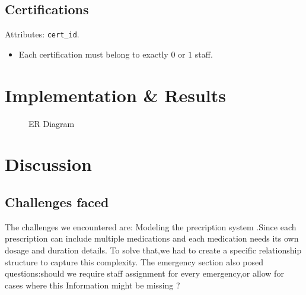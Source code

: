 \documentclass[a4paper,12pt]{article}
\begin{document}
\subsection*{Certifications}
Attributes: \texttt{cert\_id}.
\begin{itemize}
    \item Each certification must belong to exactly $0$ or $1$ staff.
\end{itemize}
\section{Implementation \& Results}
\begin{figure}[htbp]
    \caption{ER Diagram}
    \label{fig:ERD}
\end{figure}

\newpage


\section{Discussion}
\subsection*{Challenges faced}
The challenges we encountered are:
Modeling the precription system .Since each prescription
can include multiple medications and each medication needs its own dosage and duration details.
To solve that,we had to create a specific relationship structure to capture this complexity.
The emergency section also posed questions:should we require staff assignment for every emergency,or allow for cases where this Information
might be missing ?
\end{document}

